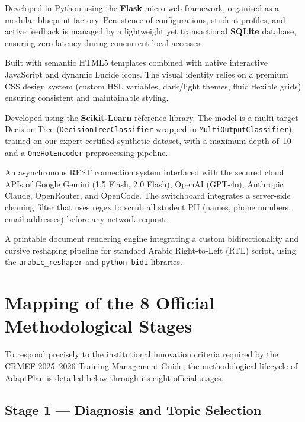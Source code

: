 \documentclass[12pt,a4paper]{report}
\begin{document}
\begin{description}[leftmargin=2em, style=nextline]
  \item[Application Framework (Backend)] Developed in Python using the \textbf{Flask} micro-web framework, organised as a modular blueprint factory. Persistence of configurations, student profiles, and active feedback is managed by a lightweight yet transactional \textbf{SQLite} database, ensuring zero latency during concurrent local accesses.
  \item[Teacher Interface (Frontend)] Built with semantic HTML5 templates combined with native interactive JavaScript and dynamic Lucide icons. The visual identity relies on a premium CSS design system (custom HSL variables, dark/light themes, fluid flexible grids) ensuring consistent and maintainable styling.
  \item[Machine Learning Engine] Developed using the \textbf{Scikit-Learn} reference library. The model is a multi-target Decision Tree (\texttt{DecisionTreeClassifier} wrapped in \texttt{MultiOutputClassifier}), trained on our expert-certified synthetic dataset, with a maximum depth of~10 and a \texttt{OneHotEncoder} preprocessing pipeline.
  \item[Generative AI Switchboard] An asynchronous REST connection system interfaced with the secured cloud APIs of Google Gemini (1.5 Flash, 2.0 Flash), OpenAI (GPT-4o), Anthropic Claude, OpenRouter, and OpenCode. The switchboard integrates a server-side cleaning filter that uses regex to scrub all student PII (names, phone numbers, email addresses) before any network request.
  \item[ReportLab PDF Generator] A printable document rendering engine integrating a custom bidirectionality and cursive reshaping pipeline for standard Arabic Right-to-Left (RTL) script, using the \texttt{arabic\_reshaper} and \texttt{python-bidi} libraries.
\end{description}

\section{Mapping of the 8 Official Methodological Stages}

To respond precisely to the institutional innovation criteria required by the CRMEF 2025--2026 Training Management Guide, the methodological lifecycle of AdaptPlan is detailed below through its eight official stages.

\subsection{Stage 1 — Diagnosis and Topic Selection}
\end{document}
